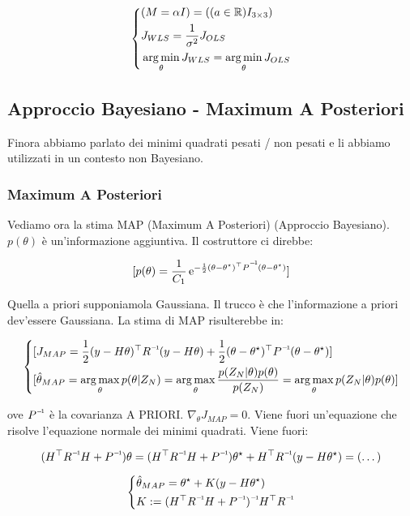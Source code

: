 \[
	\left\{
	\begin{aligned}
	&(M=\alpha I) = ((a\in\mathbb{R})I_{3\times 3})\\
	&J_{WLS} = \frac{1}{\sigma^2}J_{OLS}\\
	&\operatorname*{arg\,min}_\theta{J_{WLS}} = \operatorname*{arg\,min}_\theta{J_{OLS}}
	\end{aligned}
	\right.
\]

\subsection{Approccio Bayesiano - Maximum A Posteriori}

Finora abbiamo parlato dei minimi quadrati pesati / non pesati e li abbiamo utilizzati in un contesto non Bayesiano.

\subsubsection{Maximum A Posteriori}

Vediamo ora la stima MAP (Maximum A Posteriori) (Approccio Bayesiano). $p(\theta)$ è un'informazione aggiuntiva. Il costruttore ci direbbe:

\[
	[p(\theta) = \frac{1}{C_1}\e^{-\frac{1}{2}(\theta-\theta^\star)^\top\inv{P}(\theta-\theta^\star)}]
\]

Quella a priori supponiamola Gaussiana. Il trucco è che l'informazione a priori dev'essere Gaussiana. La stima di MAP risulterebbe in:

\[
	\left\{
	\begin{aligned}
	&[J_{MAP} = \frac{1}{2}(y-H\theta)^\top\inv{R}(y-H\theta) + \frac{1}{2}(\theta-\theta^\star)^\top\inv{P}(\theta-\theta^\star)]\\
	&[\hat{\theta}_{MAP} = \argmax_\theta{p(\theta|Z_N) = \argmax_\theta{\frac{p(Z_N|\theta)p(\theta)}{p(Z_N)}} = \argmax_\theta{p(Z_N|\theta)p(\theta)}}]
	\end{aligned}
	\right.
\]

ove $\inv{P}$ è la covarianza A PRIORI. $\nabla_\theta{J_{MAP}} = 0$. Viene fuori un'equazione che risolve l'equazione normale dei minimi quadrati. Viene fuori:

\[
	(H^\top\inv{R}H+\inv{P})\theta = (H^\top\inv{R}H+\inv{P})\theta^\star + H^\top\inv{R}(y-H\theta^\star) = (\dots)
\]

\[
	\left\{
	\begin{aligned}
	&\hat{\theta}_{MAP} = \theta^\star + K(y-H\theta^\star)\\
	&K := \inv{(H^\top\inv{R}H+\inv{P})}H^\top\inv{R}
	\end{aligned}
	\right.
\]

